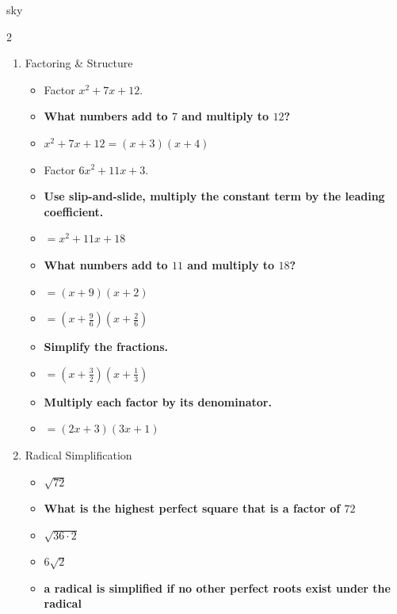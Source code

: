 \documentclass[10pt]{article}
\begin{document}
    \begin{skillbox}{sky}
        \begin{multicols}{2}
            \raggedcolumns
            \begin{enumerate}[start=4]
                \item Factoring \& Structure
                \begin{itemize}
                    \item Factor $x^2+7x+12$.
                    \item \textbf{What numbers add to $7$ and multiply to $12$?}
                    \item $x^2+7x+12=\left(x+3\right)\left(x+4\right)$
                    \item Factor $6x^2+11x+3$.
                    \item \textbf{Use slip-and-slide, multiply the constant term by the leading coefficient.}
                    \item $=x^2+11x+18$
                    \item \textbf{What numbers add to $11$ and multiply to $18$?}
                    \item $=\left( x+9 \right) \left( x+2 \right) $
                    \item $=\left( x+\frac{9}{6} \right) \left( x+\frac{2}{6} \right) $
                    \item \textbf{Simplify the fractions.}
                    \item $=\left( x+\frac{3}{2} \right) \left( x+\frac{1}{3} \right) $
                    \item \textbf{Multiply each factor by its denominator.}
                    \item $=\left( 2x+3 \right) \left( 3x+1 \right) $
                \end{itemize}
                \columnbreak
                \item Radical Simplification
                \begin{itemize}
                    \item $\sqrt{72}$
                    \item \textbf{What is the highest perfect square that is a factor of $72$}
                    \item $\sqrt{36\cdot 2}$
                    \item $6\sqrt{2}$
                    \item \textbf{a radical is simplified if no other perfect roots exist under the radical}
                \end{itemize}
            \end{enumerate}
        \end{multicols}
    \end{skillbox}
\end{document}
